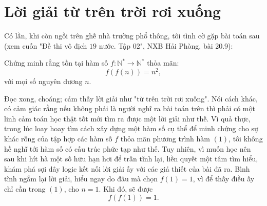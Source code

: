 
\section{Lời giải từ trên trời rơi xuống}
\begin{center}
	\textbf{\color{violet}{Tạp chí Pi tháng 6, tháng 7 năm 2018}}
\end{center}
\noindent Có lần, khi còn ngồi trên ghế nhà trường phổ thông, tôi tình cờ gặp bài toán sau (xem cuốn "Đề thi vô địch $19$ nước. Tập 02", NXB Hải Phòng, bài 20.9):


\begin{bt}
	Chứng minh rằng tồn tại hàm số $f: \mathbb{N}^*\longrightarrow \mathbb{N}^*$ thỏa mãn: \[f\left(f\left(n\right)\right)=n^2,\tag{1}\]
	với mọi số nguyên dương $n$.
\end{bt}
Đọc xong, choáng; cảm thấy lời giải như "từ trên trời rơi xuống". Nói cách khác, có cảm giác rằng nếu không phải là người nghĩ ra bài toán trên thì phải có một linh cảm toán học thật tốt mới tìm ra được một lời giải như thế. Vì quả thực, trong lúc loay hoay tìm cách xây dựng một hàm số cụ thể để minh chứng cho sự khác rỗng của tập hợp các hàm số $f$ thỏa mãn phương trình hàm $(1)$, tôi không hề nghĩ tới hàm số có cấu trúc phức tạp như thế. Tuy nhiên, vì muốn học nên sau khi hít hà một số hữu hạn hơi để trấn tĩnh lại, liền quyết một tâm tìm hiểu, khám phá sợi dây logic kết nối lời giải ấy với các giả thiết của bài đã ra. Bình tĩnh ngắm lại lời giải, hiểu ngay do đâu mà chọn $f(1)=1$, vì để thấy điều ấy chỉ cần trong $(1)$, cho $n=1$. Khi đó, sẽ được $$f\left(f\left(1\right)\right)=1.$$
